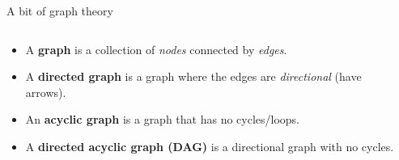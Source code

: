 \documentclass{acm}
\begin{document}
\begin{frame}{A bit of graph theory}
    \begin{columns}
    \begin{column}{0.6\textwidth}
        \begin{itemize}[<+->]
            \item A \textbf{graph} is a collection of \textit{nodes} connected by
                \textit{edges}.
            \item A \textbf{directed graph} is a graph where the edges are
                \textit{directional} (have arrows).
            \item An \textbf{acyclic graph} is a graph that has no cycles/loops.
            \item A \textbf{directed acyclic graph (DAG)} is a directional graph
                with no cycles.
        \end{itemize}
    \end{column}%
    \begin{column}{0.4\textwidth} %
    \end{column}
    \end{columns}
\end{frame}
\end{document}
